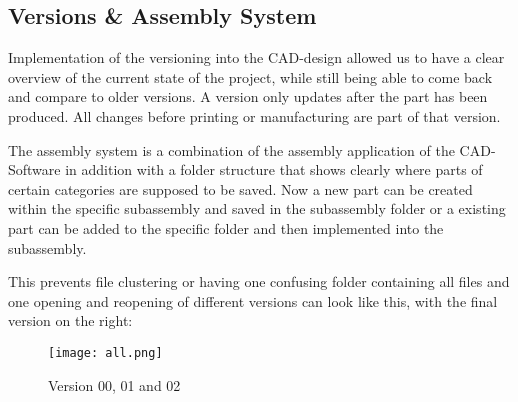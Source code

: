\documentclass[../report.tex]{subfiles}
\begin{document}
\maketitle

\subsection{Versions \& Assembly System}
Implementation of  the versioning into the CAD-design allowed us to have a clear overview
of the current state of the project, while still being able to come back and compare to older 
versions. 
A version only updates after the part has been produced. All changes before 
printing or manufacturing are part of that version.

The assembly system is a combination of the assembly application of the CAD-Software
in addition with a folder structure that shows clearly where parts of certain categories 
are supposed to be saved. Now a new part can be created within the specific subassembly and 
saved in the subassembly folder or a existing part can be added to the specific folder and 
then implemented into the subassembly. 

This prevents file clustering or having one confusing folder containing all files and one opening 
and reopening of different versions can look like this, with the final version on the right:
\begin{figure}[H]
    \texttt{[image: all.png]}
    \caption{Version 00, 01 and 02}
\end{figure}
\end{document}
